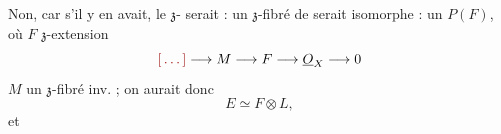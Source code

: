 \documentclass[11pt,a4paper]{article}
\begin{document}

Non, car s'il y en avait, le $\mathfrak{z}$-\ill{} serait
 : un $\mathfrak{z}$-fibré  de \ill{}
serait isomorphe : un $P(F)$, où $F$ \ill{} $\mathfrak{z}$-extension
\[
  \ill{} \longrightarrow M \longrightarrow F \longrightarrow
  \underline{O}_X \longrightarrow 0
\]
\ill{} $M$ un $\mathfrak{z}$-fibré \ill{} inv. \ill{} ; on aurait donc
\[
  E \simeq F \otimes L,
\]
et \struck{\ill{}}
\end{document}
